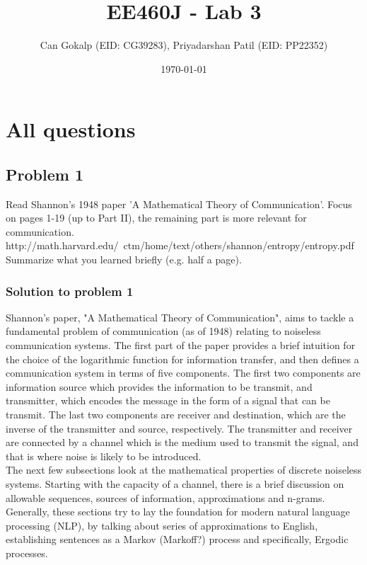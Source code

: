 \documentclass[12pt]{article}%
\begin{document}
\title{EE460J - Lab 3}
\author{Can Gokalp (EID: CG39283), Priyadarshan Patil (EID: PP22352)}
\date{\today}
\maketitle

\section{All questions}


\subsection{Problem 1}

Read Shannon's 1948 paper 'A Mathematical Theory of Communication'. Focus on pages 1-19 (up to Part II), the remaining part is more relevant for communication. http://math.harvard.edu/~ctm/home/text/others/shannon/entropy/entropy.pdf Summarize what you learned briefly (e.g. half a page).

\subsubsection{Solution to problem 1}

Shannon's paper, "A Mathematical Theory of Communication", aims to tackle a fundamental problem of communication (as of 1948) relating to noiseless communication systems. The first part of the paper provides a brief intuition for the choice of the logarithmic function for information transfer, and then defines a communication system in terms of five components. The first two components are information source which provides the information to be transmit, and transmitter, which encodes the message in the form of a signal that can be transmit. The last two components are receiver and destination, which are the inverse of the transmitter and source, respectively. The transmitter and receiver are connected by a channel which is the medium used to transmit the signal, and that is where noise is likely to be introduced.\\

The next few subsections look at the mathematical properties of discrete noiseless systems. Starting with the capacity of a channel, there is a brief discussion on allowable sequences, sources of information, approximations and n-grams. Generally, these sections try to lay the foundation for modern natural language processing (NLP), by talking about series of approximations to English, establishing sentences as a Markov (Markoff?) process and specifically, Ergodic processes.
\end{document}
